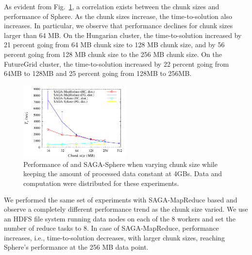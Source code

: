 \documentclass[3p,twocolumn]{elsarticle}
\begin{document}
As evident from Fig.~\ref{fig:sphere_mr_chunksize}, a correlation
exists between the chunk sizes and performance of Sphere.  As the
chunk sizes increase, the time-to-solution also increases. In
particular, we observe that performance declines for chunk sizes
larger than 64 MB. On the Hungarian cluster, the time-to-solution
increased by 21 percent going from 64 MB chunk size to 128 MB chunk
size, and by 56 percent going from 128 MB chunk size to the 256 MB
chunk size. On the FutureGrid cluster, the time-to-solution increased
by 22 percent going from 64MB to 128MB and 25 percent going from 128MB
to 256MB.



\begin{figure}[htb!]
 \dnnn\dnnn
 \includegraphics[width=0.5\textwidth]{figures/sphere_mr_varying_chunksize.pdf}
 \caption{
   Performance of \sagamapreduce and
   SAGA-Sphere when varying chunk size while keeping the amount
   of processed data constant at 4GBs. Data and computation were
   distributed for these experiments.
   \label{fig:sphere_mr_chunksize}
 }
\end{figure}

We performed the same set of experiments with SAGA-MapReduce based \wc
and observe a completely different performance trend as the chunk size
varied.  We use an HDFS file system running data nodes on each of the
8 workers and set the number of reduce tasks to 8.  In case of
SAGA-MapReduce, performance increases, i.e., time-to-solution
decreases, with larger chunk sizes, reaching Sphere's performance at
the 256 MB data point.
\end{document}
